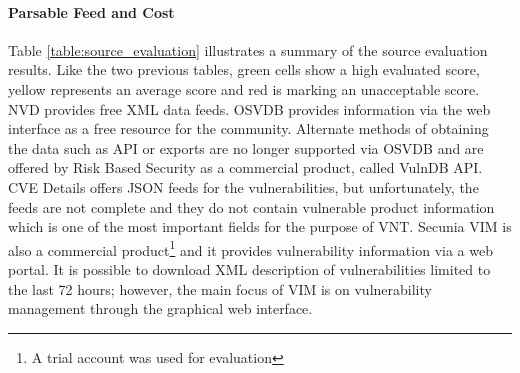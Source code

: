     
    
    
    
\paragraph{Parsable Feed and Cost}
Table \ref{table:source_evaluation} illustrates a summary of the source evaluation results. Like the two previous tables, green cells show a high evaluated score, yellow represents an average score and red is marking an unacceptable score. NVD provides free XML data feeds. OSVDB provides information via the web interface as a free resource for the community. Alternate methods of obtaining the data such as API or exports are no longer supported via OSVDB and are offered by Risk Based Security as a commercial product, called VulnDB API. CVE Details offers JSON feeds for the vulnerabilities, but unfortunately, the feeds are not complete and they do not contain vulnerable product information which is one of the most important fields for the purpose of VNT. Secunia VIM is also a commercial product\footnote{A trial account was used for evaluation} and it provides vulnerability information via a web portal. It is possible to download XML description of vulnerabilities limited to the last 72 hours; however, the main focus of VIM is on vulnerability management through the graphical web interface. 
    
    
    
    
    
